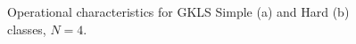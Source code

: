 \documentclass[runningheads]{llncs}
\begin{document}
\begin{figure}
\begin{minipage}{0.5\linewidth}
\end{minipage}
\hfill
\begin{minipage}{0.5\linewidth}
\end{minipage}
\caption{Operational characteristics for GKLS Simple (a) and Hard (b) classes, $N=4$.}
\label{oper4}
\end{figure}
\end{document}
